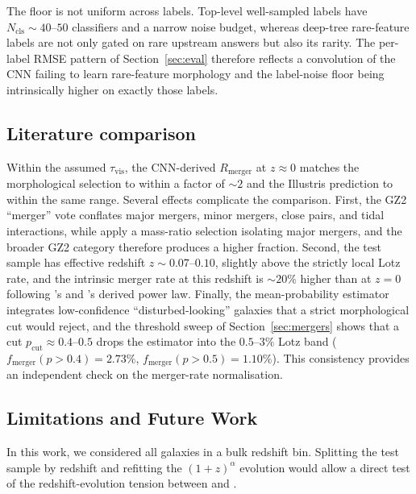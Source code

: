 \documentclass[10pt,preprint2]{aastex}
\begin{document}
The floor is not uniform across labels. Top-level well-sampled labels have $N_{\mathrm{cls}} \sim 40$--$50$ classifiers and a narrow noise budget, whereas deep-tree rare-feature labels are not only gated on rare upstream answers but also its rarity. The per-label RMSE pattern of Section~\ref{sec:eval} therefore reflects a convolution of the CNN failing to learn rare-feature morphology and the label-noise floor being intrinsically higher on exactly those labels.

\subsection{Literature comparison}
\label{sec:merger-rate}
Within the assumed $\tau_{\mathrm{vis}}$, the CNN-derived $R_{\mathrm{merger}}$ at $z \approx 0$ matches the \citet{Lotz2011} morphological selection to within a factor of $\sim 2$ and the \citet{RodriguezGomez2015} Illustris prediction to within the same range. Several effects complicate the comparison. First, the GZ2 ``merger'' vote conflates major mergers, minor mergers, close pairs, and tidal interactions, while \citet{Lotz2011} apply a mass-ratio selection isolating major mergers, and the broader GZ2 category therefore produces a higher fraction. Second, the test sample has effective redshift $z \sim 0.07$--$0.10$, slightly above the strictly local Lotz rate, and the intrinsic merger rate at this redshift is $\sim 20\%$ higher than at $z = 0$ following \citet{Lotz2011}'s and \citet{RodriguezGomez2015}'s derived power law. Finally, the mean-probability estimator integrates low-confidence ``disturbed-looking'' galaxies that a strict morphological cut would reject, and the threshold sweep of Section~\ref{sec:mergers} shows that a cut $p_{\mathrm{cut}} \approx 0.4$--$0.5$ drops the estimator into the $0.5$--$3\%$ Lotz band ($f_{\mathrm{merger}}(p > 0.4) = 2.73\%$, $f_{\mathrm{merger}}(p > 0.5) = 1.10\%$). This consistency provides an independent check on the merger-rate normalisation.

\subsection{Limitations and Future Work}
In this work, we considered all galaxies in a bulk redshift bin. Splitting the test sample by redshift and refitting the $(1 + z)^\alpha$ evolution would allow a direct test of the redshift-evolution tension between \citet{Lotz2011} and \citet{RodriguezGomez2015}. 

\end{document}
